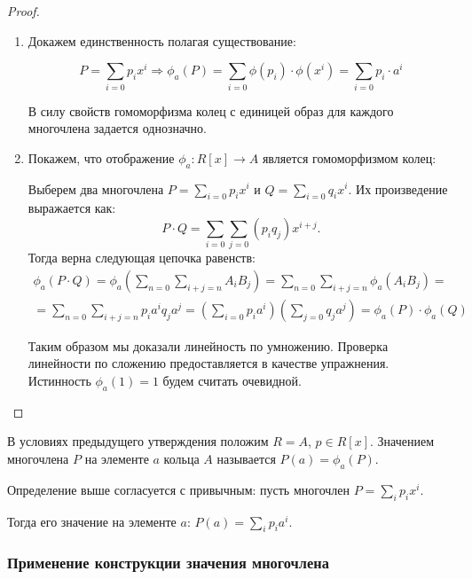 \begin{proof}~
    \begin{enumerate}
        \item Докажем единственность полагая существование:

        $$P = \sum_{i = 0} p_ix^i \Rightarrow \phi_a(P) = \sum_{i = 0} \phi(p_i)\cdot\phi(x^i) = \sum_{i = 0}p_i \cdot a^i$$
        
        В силу свойств гомоморфизма колец с единицей образ для каждого многочлена задается однозначно.

        \item Покажем, что отображение $\phi_a : R[x] \to A$ является гомоморфизмом колец:

        Выберем два многочлена $P = \displaystyle\sum_{i = 0} p_i x^i$ и 
        $Q = \displaystyle\sum_{i = 0} q_i x^i$. Их произведение выражается как: 
        $$P \cdot Q = \displaystyle\sum_{i=0}\displaystyle\sum_{j = 0}(p_i q_j)x^{i+j}.$$ 
        Тогда верна следующая цепочка равенств:
        \begin{align}
            \phi_a(P \cdot Q) = \phi_a(\sum_{n = 0}\sum_{i + j = n} A_i B_j) = \sum_{n = 0}\sum_{i + j = n} \phi_a(A_i B_j) = \\ = \sum_{n = 0}\sum_{i + j = n} p_i a^i q_j a^j = (\sum_{i = 0}p_i a^i)(\sum_{j = 0} q_j a^j) = \phi_a(P) \cdot \phi_a(Q)
        \end{align}
        
        Таким образом мы доказали линейность по умножению. Проверка линейности по сложению 
        предоставляется в качестве упражнения. Истинность $\phi_a(1) = 1$ будем считать очевидной.
    \end{enumerate}
\end{proof}

\begin{definition}
    В условиях предыдущего утверждения положим $R = A$, $p \in R[x]$.
    Значением многочлена $P$ на элементе $a$ кольца $A$ называется $P(a) = \phi_a(P)$.
\end{definition}

\begin{note}
    Определение выше согласуется с привычным: пусть многочлен $P = \displaystyle\sum_{i} p_i x^i$.
    
    Тогда его значение на элементе $a$: $P(a) = \displaystyle\sum_{i} p_i a^i$.
\end{note}

\subsubsection{Применение конструкции значения многочлена}

